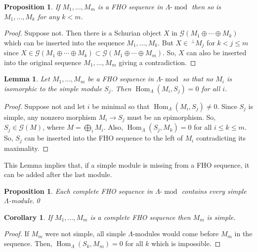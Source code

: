 \documentclass[10pt]{amsart}
\newtheorem{prop}[theo]{Proposition}
\newtheorem{lemm}[theo]{Lemma}
\newtheorem{coro}[theo]{Corollary}
\theoremstyle{definition}
\DeclareMathOperator{\Hom}{Hom}%
\DeclareMathOperator{\modr}{mod}
\newcommand{\cG}{\ensuremath{{\mathcal{G}}}}
\begin{document}
\begin{prop}\label{prop:subsequence of hom orth is hom orth}
If $M_1,\ldots,M_m$ is a FHO sequence in $\Lambda\text{-}\modr $ then so is $M_1,\ldots,M_k$ for any $k<m$.
\end{prop}

\begin{proof}
Suppose not. Then there is a Schurian object $X$ in $\cG(M_1\oplus \cdots\oplus M_k)$ which can be inserted into the sequence $M_1,\ldots,M_k$. But $X\in \,^\perp M_j$ for $k<j\le m$ since $X\in \cG(M_1\oplus\cdots\oplus M_k)\subset \cG(M_1\oplus\cdots\oplus M_m)$. So, $X$ can also be inserted into the original sequence $M_1,\ldots,M_m$ giving a contradiction.
\end{proof}

\begin{lemm}\label{lem:when Sk is not one of the Mi}
Let $M_1,\ldots,M_m$ be a FHO sequence in $\Lambda\text{-}\modr $ so that no $M_i$ is isomorphic to the simple module $S_j$. Then $\Hom_\Lambda(M_i,S_j)=0$ for all $i$.
\end{lemm}

\begin{proof}
Suppose not and let $i$ be minimal so that $\Hom_\Lambda(M_i,S_j)\neq0$. Since $S_j$ is simple, any nonzero morphism $M_i\to S_j$ must be an epimorphism. So, $S_j\in\cG(M)$, where $M=\bigoplus_iM_i$. Also, $\Hom_\Lambda(S_j,M_k)=0$ for all $i\le k\le m$. So, $S_j$ can be inserted into the FHO sequence to the left of $M_i$ contradicting its maximality.
\end{proof}

This Lemma implies that, if a simple module is missing from a FHO sequence, it can be added after the last module.

\begin{prop}
Each complete FHO sequence in $\Lambda\text{-}\modr $ contains every simple $\Lambda$-module.\qed
\end{prop}

\begin{coro}\label{cor: every comple fhos ends in a simple}
If $M_1,\ldots,M_m$ is a complete FHO sequence then $M_m$ is simple.
\end{coro}

\begin{proof}
If $M_m$ were not simple, all simple $\Lambda$-modules would come before $M_m$ in the sequence. Then, $\Hom_\Lambda(S_k,M_m)=0$ for all $k$ which is impossible.
\end{proof}
\end{document}
